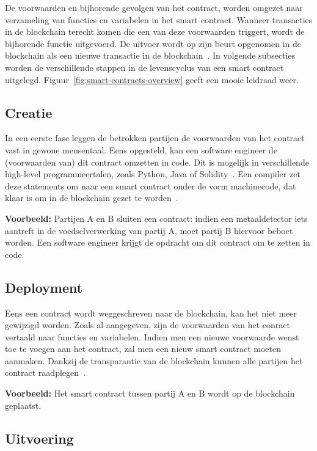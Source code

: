 De voorwaarden en bijhorende gevolgen van het contract, worden omgezet naar verzameling van functies en variabelen in het smart contract. Wanneer transacties in de blockchain terecht komen die een van deze voorwaarden triggert, wordt de bijhorende functie uitgevoerd. De uitvoer wordt op zijn beurt opgenomen in de blockchain als een nieuwe transactie in de blockchain~\autocite{Zheng2019}. In volgende subsecties worden de verschillende stappen in de levenscyclus van een smart contract uitgelegd. Figuur~\ref{fig:smart-contracts-overview} geeft een mooie leidraad weer.

\subsection{Creatie}

In een eerste fase leggen de betrokken partijen de voorwaarden van het contract vast in gewone mensentaal. Eens opgesteld, kan een software engineer de (voorwaarden van) dit contract omzetten in code. Dit is mogelijk in verschillende high-level programmeertalen, zoals Python, Java of Solidity~\autocite{Bahga2016}. Een compiler zet deze statements om naar een smart contract onder de vorm machinecode, dat klaar is om in de blockchain gezet te worden~\autocite{Zheng2019}.

\textbf{Voorbeeld:}
Partijen A en B sluiten een contract: indien een metaaldetector iets aantreft in de voedselverwerking van partij A, moet partij B hiervoor beboet worden. Een software engineer krijgt de opdracht om dit contract om te zetten in code.

\subsection{Deployment}

Eens een contract wordt weggeschreven naar de blockchain, kan het niet meer gewijzigd worden. Zoals al aangegeven, zijn de voorwaarden van het conract vertaald naar functies en variabelen. Indien men een nieuwe voorwaarde wenst toe te voegen aan het contract, zal men een nieuw smart contract moeten aanmaken. Dankzij de transparantie van de blockchain kunnen alle partijen het contract raadplegen~\autocite{Zheng2019}.

\textbf{Voorbeeld:}
Het smart contract tussen partij A en B wordt op de blockchain geplaatst.

\subsection{Uitvoering}

